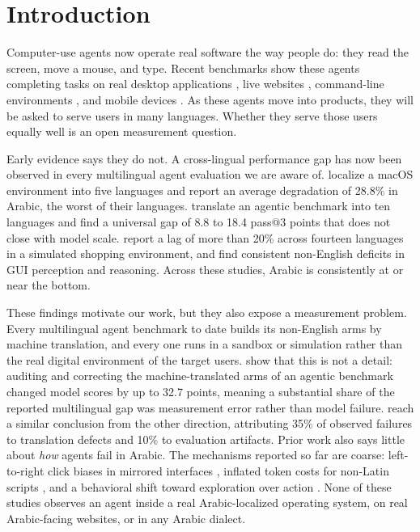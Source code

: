 \section{Introduction}
\label{sec:intro}

Computer-use agents now operate real software the way people do: they read the
screen, move a mouse, and type. Recent benchmarks show these agents completing
tasks on real desktop applications \citep{xie2024osworld}, live websites
\citep{zhang2026clawbench}, command-line environments
\citep{merrill2026terminalbench}, and mobile devices
\citep{rawles2024androidworld}. As these agents move into products, they will be
asked to serve users in many languages. Whether they serve those users equally
well is an open measurement question.

Early evidence says they do not. A cross-lingual performance gap has now been
observed in every multilingual agent evaluation we are aware of.
\citet{yang2025macosworld} localize a macOS environment into five languages and
report an average degradation of 28.8\% in Arabic, the worst of their languages.
\citet{caciolai2026omnilingual} translate an agentic benchmark into ten
languages and find a universal gap of 8.8 to 18.4 pass@3 points that does not
close with model scale. \citet{wang2025xwebagentbench} report a lag of more than
20\% across fourteen languages in a simulated shopping environment, and
\citet{chen2025mprgui} find consistent non-English deficits in GUI perception
and reasoning. Across these studies, Arabic is consistently at or near the
bottom.

These findings motivate our work, but they also expose a measurement problem.
Every multilingual agent benchmark to date builds its non-English arms by
machine translation, and every one runs in a sandbox or simulation rather than
the real digital environment of the target users.
\citet{kim2026lilt} show that this is not a detail: auditing and correcting the
machine-translated arms of an agentic benchmark changed model scores by up to
32.7 points, meaning a substantial share of the reported multilingual gap was
measurement error rather than model failure. \citet{caciolai2026omnilingual}
reach a similar conclusion from the other direction, attributing 35\% of
observed failures to translation defects and 10\% to evaluation artifacts.
Prior work also says little about \emph{how} agents fail in Arabic. The
mechanisms reported so far are coarse: left-to-right click biases in mirrored
interfaces \citep{yang2025macosworld}, inflated token costs for non-Latin
scripts \citep{wang2025xwebagentbench,hofman2025maps}, and a behavioral shift
toward exploration over action \citep{caciolai2026omnilingual}. None of these
studies observes an agent inside a real Arabic-localized operating system, on
real Arabic-facing websites, or in any Arabic dialect.

